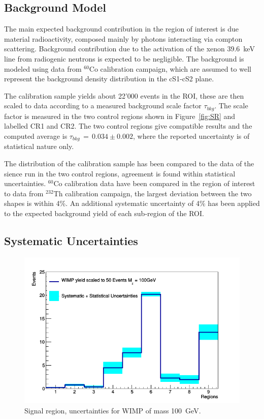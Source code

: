 \subsection {Background Model}

The main expected background contribution in the region of interest is due material radioactivity, composed mainly by photons  
interacting via compton scattering. Background contribution due to the activation of the xenon 39.6~keV line from radiogenic neutrons is expected to be negligible.
The background is modeled using data from $^{60}$Co calibration campaign, which are assumed to well represent the background density distribution 
in the cS1-cS2 plane. 

The calibration sample yields  about 22'000 events in the ROI, these are then scaled to data according to a measured background scale factor $\tau_{bkg}$.
The scale factor is measured in the two control regions shown in Figure~\ref{fig:SR} and labelled CR1 and CR2. The two control 
regions give compatible results and the computed average is $\tau_{bkg} \, =  \, 0.034 \pm 0.002 $, where the reported uncertainty 
is of statistical nature only.

The distribution of the calibration sample has been compared to the data of the sience run in the two control regions,
agreement is found within statistical uncertainties. $^{60}$Co calibration data have been compared in the region of interest to  
data from $^{232}$Th calibration campaign, the largest deviation between the two shapes is within 4\%. An additional systematic
uncertainty of 4\% has been applied to the expected background yield of each sub-region of the ROI.




\subsection{Systematic Uncertainties}

\begin{figure}[t!]
  \includegraphics[width=\linewidth]{images/wimp_sys_unc.png}
  \caption{Signal region, uncertainties for WIMP of mass 100~GeV.}
  \label{fig:unc}
\end{figure}



